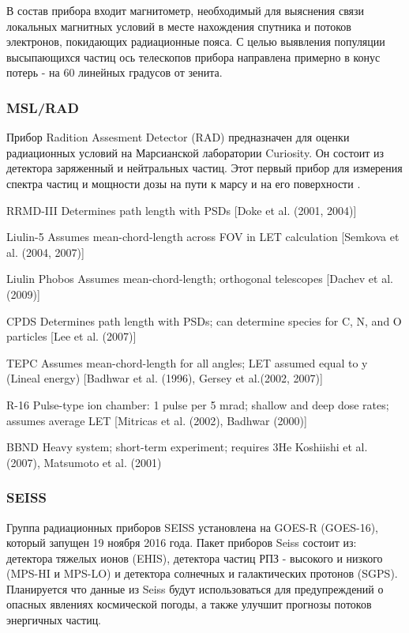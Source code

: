 В состав прибора входит магнитометр, необходимый для выяснения связи локальных магнитных условий в месте нахождения спутника и потоков электронов, покидающих радиационные пояса. С целью выявления популяции высыпающихся частиц ось телескопов прибора направлена примерно в конус потерь - на 60 линейных градусов от зенита.




\subsubsection{MSL/RAD}
Прибор Radition Assesment Detector (RAD) предназначен для оценки радиационных условий на Марсианской лаборатории Curiosity. Он состоит из детектора заряженный и нейтральных частиц\cite{Zeitlin2016}. Этот первый прибор для измерения спектра частиц и мощности дозы на пути к марсу и на его поверхности \cite{Matthia}.

RRMD-III Determines path length with PSDs [Doke et al. (2001, 2004)]


Liulin-5 Assumes mean-chord-length across FOV in LET calculation [Semkova et al. (2004, 2007)]


Liulin Phobos Assumes mean-chord-length; orthogonal telescopes [Dachev et al. (2009)]


CPDS Determines path length with PSDs; can determine species for C, N, and O particles [Lee et al. (2007)]


TEPC Assumes mean-chord-length for all angles; LET assumed equal to y (Lineal energy) [Badhwar et al. (1996), Gersey et al.(2002, 2007)]


R-16 Pulse-type ion chamber: 1 pulse per 5 mrad; shallow and deep dose rates; assumes average LET [Mitricas et al. (2002), Badhwar (2000)]


BBND Heavy system; short-term experiment; requires 3He Koshiishi et al. (2007), Matsumoto et al. (2001)

\subsubsection{SEISS}
Группа радиационных приборов SEISS установлена на GOES-R (GOES-16)\cite{Goodman2013}, который запущен 19 ноября 2016 года. 
Пакет приборов Seiss состоит из: детектора тяжелых ионов  (EHIS), детектора частиц РПЗ - высокого и низкого (MPS-HI и MPS-LO) и детектора солнечных и галактических протонов (SGPS). Планируется что данные из Seiss будут использоваться для предупреждений о опасных явлениях космической погоды, а также улучшит прогнозы потоков энергичных частиц. 

